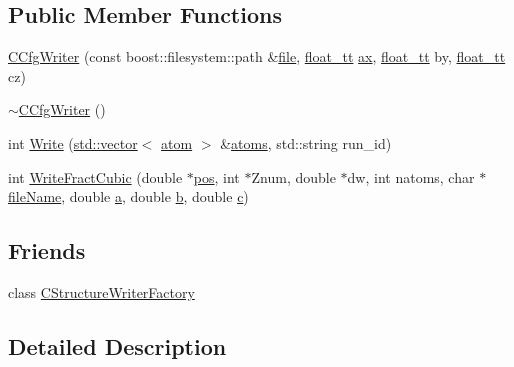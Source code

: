 \subsection*{Public Member Functions}
\begin{DoxyCompactItemize}
\item 
\hyperlink{class_q_s_t_e_m_1_1_c_cfg_writer_a3d1279eb2ff828dcde71079d964b0b41}{C\-Cfg\-Writer} (const boost\-::filesystem\-::path \&\hyperlink{write_fields2_file_8m_a75658b9c899229893bf0bc9d90e97d93}{file}, \hyperlink{namespace_q_s_t_e_m_a915d7caa497280d9f927c4ce8d330e47}{float\-\_\-tt} \hyperlink{image_sim_8m_a8fa675eb2fcec5b95d9d21c670da7f30}{ax}, \hyperlink{namespace_q_s_t_e_m_a915d7caa497280d9f927c4ce8d330e47}{float\-\_\-tt} by, \hyperlink{namespace_q_s_t_e_m_a915d7caa497280d9f927c4ce8d330e47}{float\-\_\-tt} cz)
\item 
\hyperlink{class_q_s_t_e_m_1_1_c_cfg_writer_a71782dce4f93fe9f81df8c7d9cde4192}{$\sim$\-C\-Cfg\-Writer} ()
\item 
int \hyperlink{class_q_s_t_e_m_1_1_c_cfg_writer_aae87b30863fb8ea4e23bf03828874f51}{Write} (\hyperlink{qmb_8m_af54b69a32590de218622e869b06b47b3}{std\-::vector}$<$ \hyperlink{namespace_q_s_t_e_m_a402dabc31a7a1fe906d0cdd138c69686}{atom} $>$ \&\hyperlink{qmb_8m_a7c5cd0264da47e230ba8c984690fe16c}{atoms}, std\-::string run\-\_\-id)
\item 
int \hyperlink{class_q_s_t_e_m_1_1_c_cfg_writer_ae4713d48eb11fe5bee1f16678d0e3932}{Write\-Fract\-Cubic} (double $\ast$\hyperlink{_display_model_properties_8m_adf54215d760dbf0f9fe5627a39015333}{pos}, int $\ast$Znum, double $\ast$dw, int natoms, char $\ast$\hyperlink{qmb_8m_a7a230f02bdffebd1357e3c0b49e01271}{file\-Name}, double \hyperlink{image_sim_8m_aa9c57d86c53f86ed6afc6339a0476363}{a}, double \hyperlink{xyz2cfg_8m_a21ad0bd836b90d08f4cf640b4c298e7c}{b}, double \hyperlink{image_sim_8m_a463b16ca2bfa2f0cbab0e62fcb263d8e}{c})
\end{DoxyCompactItemize}
\subsection*{Friends}
\begin{DoxyCompactItemize}
\item 
class \hyperlink{class_q_s_t_e_m_1_1_c_cfg_writer_af47b382d447249dc45c11034c1277af4}{C\-Structure\-Writer\-Factory}
\end{DoxyCompactItemize}


\subsection{Detailed Description}


